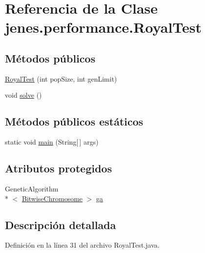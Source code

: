 \hypertarget{classjenes_1_1performance_1_1_royal_test}{\section{Referencia de la Clase jenes.\-performance.\-Royal\-Test}
\label{classjenes_1_1performance_1_1_royal_test}
}
\subsection*{Métodos públicos}
\begin{DoxyCompactItemize}
\item 
\hyperlink{classjenes_1_1performance_1_1_royal_test_a07b3000deb54543974d475d6acf38243}{Royal\-Test} (int pop\-Size, int gen\-Limit)
\item 
void \hyperlink{classjenes_1_1performance_1_1_royal_test_a4338b121c1d581f022691a2db6d53e55}{solve} ()
\end{DoxyCompactItemize}
\subsection*{Métodos públicos estáticos}
\begin{DoxyCompactItemize}
\item 
static void \hyperlink{classjenes_1_1performance_1_1_royal_test_a9af2c54a5edd971c03fec8e3b5f0f8c3}{main} (String\mbox{[}$\,$\mbox{]} args)
\end{DoxyCompactItemize}
\subsection*{Atributos protegidos}
\begin{DoxyCompactItemize}
\item 
Genetic\-Algorithm\\*
$<$ \hyperlink{classjenes_1_1chromosome_1_1_bitwise_chromosome}{Bitwise\-Chromosome} $>$ \hyperlink{classjenes_1_1performance_1_1_royal_test_a1b996f1c7dd63921753d3e5d70261eb5}{ga}
\end{DoxyCompactItemize}


\subsection{Descripción detallada}


Definición en la línea 31 del archivo Royal\-Test.\-java.




